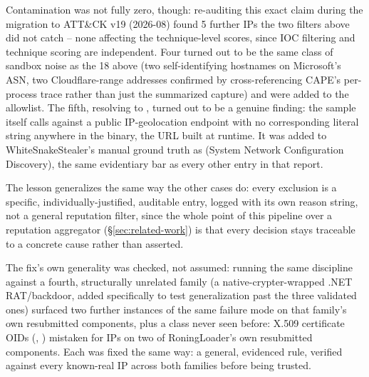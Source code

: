 Contamination was not fully zero, though: re-auditing this exact claim
during the migration to ATT\&CK v19 (2026-08) found 5 further IPs the
two filters above did not catch -- none affecting the technique-level
scores, since IOC filtering and technique scoring are independent. Four
turned out to be the same class of sandbox noise as the 18 above (two
self-identifying  hostnames on Microsoft's ASN, two
Cloudflare-range addresses confirmed by cross-referencing CAPE's
per-process  trace rather than just the summarized
capture) and were added to the allowlist. The fifth, resolving to
, turned out to be a genuine finding: the sample itself
calls  against a public IP-geolocation
endpoint with no corresponding literal string anywhere in the binary,
the URL built at runtime. It was added to WhiteSnakeStealer's manual
ground truth as  (System Network Configuration
Discovery), the same evidentiary bar as every other entry in that
report.

The lesson generalizes the same way the other cases do: every exclusion
is a specific, individually-justified, auditable entry, logged with its
own reason string, not a general reputation filter, since the whole
point of this pipeline over a reputation aggregator
(\S\ref{sec:related-work}) is that every decision stays traceable to a
concrete cause rather than asserted.

The fix's own generality was checked, not assumed: running the same
discipline against a fourth, structurally unrelated family (a
native-crypter-wrapped .NET RAT/backdoor, added specifically to test
generalization past the three validated ones) surfaced two further
instances of the same failure mode on that family's own resubmitted
components, plus a class never seen before: X.509 certificate OIDs
(, ) mistaken for IPs on two of
RoningLoader's own resubmitted components. Each was fixed the same way:
a general, evidenced rule, verified against every known-real IP across
both families before being trusted.
